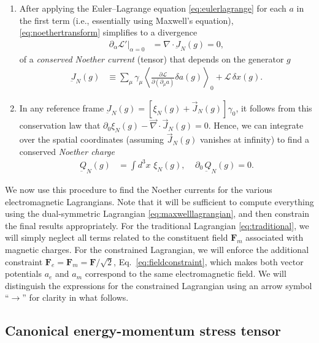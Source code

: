 \documentclass[1p,sort&compress]{elsarticle}
\numberwithin{equation}{section}
\newcommand{\rv}[1]{\vec{#1}}
\newcommand{\bv}[1]{\mathbf{#1}}
\newcommand{\smean}[1]{\left\langle #1 \right\rangle}
\begin{document}
\begin{enumerate}
  \item After applying the Euler--Lagrange equation \eqref{eq:eulerlagrange} for each $a$ in the first term (i.e., essentially using Maxwell's equation), \eqref{eq:noethertransform} simplifies to a divergence
    \begin{align}\label{eq:noether}
      \partial_\alpha\mathcal{L}'|_{\alpha = 0} &= \nabla\cdot \underbar{J}_N(g) = 0,
    \end{align}
    of a \emph{conserved Noether current} (tensor) that depends on the generator $g$ 
    \begin{align}\label{eq:noethercurrent}
      \underbar{J}_N(g) &\equiv \sum_\mu \gamma_\mu \smean{\frac{\partial\mathcal{L}}{\partial(\partial_\mu a)}\delta a(g)}_0 + \mathcal{L}\,\delta x(g).
    \end{align}

  \item In any reference frame $\underbar{J}_N(g) = [\xi_N(g) + \rv{J}_N(g)]\gamma_0$, it follows from this conservation law that $\partial_0 \xi_N(g) - \rv{\nabla}\cdot\rv{J}_N(g) = 0$.  Hence, we can integrate over the spatial coordinates (assuming $\rv{J}_N(g)$ vanishes at infinity) to find a conserved \emph{Noether charge} 
    \begin{align}\label{eq:noethercharge}
       \underbar{Q}_N(g) &= \int d^3x\,\,\xi_N(g), ~~~~~\partial_0\, \underbar{Q}_N(g) = 0.
     \end{align}
\end{enumerate}

We now use this procedure to find the Noether currents for the various electromagnetic Lagrangians.  Note that it will be sufficient to compute everything using the dual-symmetric Lagrangian \eqref{eq:maxwelllagrangian}, and then constrain the final results appropriately.  For the traditional Lagrangian \eqref{eq:traditional}, we will simply neglect all terms related to the constituent field $\bv{F}_m$ associated with magnetic charges.  For the constrained Lagrangian, we will enforce the additional constraint $\bv{F}_e = \bv{F}_m = \bv{F}/\sqrt{2}$, Eq.~\eqref{eq:fieldconstraint}, which makes both vector potentials $a_e$ and $a_m$ correspond to the same electromagnetic field.  We will distinguish the expressions for the constrained Lagrangian using an arrow symbol ``$\to$'' for clarity in what follows.


\subsection{Canonical energy-momentum stress tensor}
\end{document}
